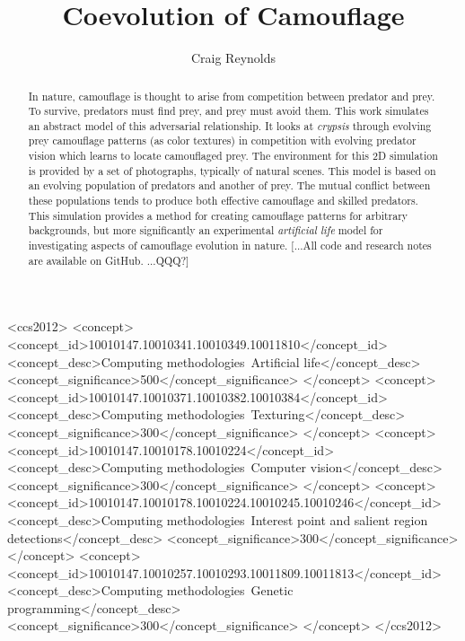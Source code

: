 \documentclass[acmtog]{acmart}
\begin{document}
\title{Coevolution of Camouflage}

\author{Craig Reynolds}

\renewcommand{\shortauthors}{Craig Reynolds}


\begin{abstract}
    In nature, camouflage is thought to arise from competition between predator and prey. To survive, predators must find prey, and prey must avoid them. This work simulates an abstract model of this adversarial relationship. It looks at \textit{crypsis} through evolving prey camouflage patterns (as color textures) in competition with evolving predator vision which learns to locate camouflaged prey. The environment for this 2D simulation is provided by a set of photographs, typically of natural scenes. This model is based on an evolving population of predators and another of prey. The mutual conflict between these populations tends to produce both effective camouflage and skilled predators. This simulation provides a method for creating camouflage patterns for arbitrary backgrounds, but more significantly an experimental \textit{artificial life} model for investigating aspects of camouflage evolution in nature. [...All code and research notes are available on GitHub. ...QQQ?]
\end{abstract}


\begin{CCSXML}
<ccs2012>
   <concept>
       <concept_id>10010147.10010341.10010349.10011810</concept_id>
       <concept_desc>Computing methodologies~Artificial life</concept_desc>
       <concept_significance>500</concept_significance>
       </concept>
   <concept>
       <concept_id>10010147.10010371.10010382.10010384</concept_id>
       <concept_desc>Computing methodologies~Texturing</concept_desc>
       <concept_significance>300</concept_significance>
       </concept>
   <concept>
       <concept_id>10010147.10010178.10010224</concept_id>
       <concept_desc>Computing methodologies~Computer vision</concept_desc>
       <concept_significance>300</concept_significance>
       </concept>
    <concept>
       <concept_id>10010147.10010178.10010224.10010245.10010246</concept_id>
       <concept_desc>Computing methodologies~Interest point and salient region detections</concept_desc>
       <concept_significance>300</concept_significance>
       </concept>
    <concept>
        <concept_id>10010147.10010257.10010293.10011809.10011813</concept_id>
        <concept_desc>Computing methodologies~Genetic programming</concept_desc>
        <concept_significance>300</concept_significance>
    </concept>
 </ccs2012>
\end{CCSXML}
\end{document}

